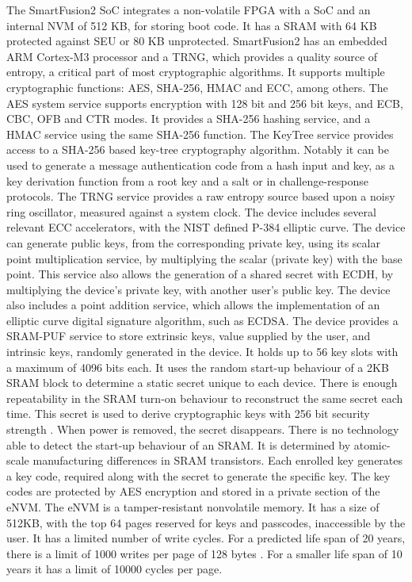 The SmartFusion2 \ac{SoC} integrates a non-volatile \ac{FPGA} with a \ac{SoC} and an internal \ac{NVM} of 512 KB, for storing boot code.
It has a \ac{SRAM} with 64 KB protected against \ac{SEU} or 80 KB unprotected. SmartFusion2 has an embedded ARM Cortex-M3 processor and a \ac{TRNG}, which provides a quality source of entropy, a critical part of most cryptographic algorithms. It supports multiple cryptographic functions: \ac{AES}, \ac{SHA}-256, \ac{HMAC} and \ac{ECC}, among others.
The \ac{AES} system service supports encryption with 128 bit and 256 bit keys, and ECB, CBC, OFB and CTR modes.
It provides a \ac{SHA}-256 hashing service, and a \ac{HMAC} service using the same \ac{SHA}-256 function.
The KeyTree service provides access to a SHA-256 based key-tree cryptography algorithm. Notably it can be used to generate a message authentication code from a hash input and key, as a key derivation function from a root key and a salt or in challenge-response protocols.
The \ac{TRNG} service provides a raw entropy source based upon a noisy ring oscillator, measured against a system clock.
The device includes several relevant \ac{ECC} accelerators, with the \ac{NIST} defined P-384 elliptic curve.
The device can generate public keys, from the corresponding private key, using its scalar point multiplication service, by multiplying the scalar (private key) with the base point. This service also allows the generation of a shared secret with \ac{ECDH}, by multiplying the device's private key, with another user's public key.
The device also includes a point addition service, which allows the implementation of an elliptic curve digital signature algorithm, such as ECDSA.
The device provides a SRAM-PUF service to store extrinsic keys, value supplied by the user, and intrinsic keys, randomly generated in the device.
It holds up to 56 key slots with a maximum of 4096 bits each.
It uses the random start-up behaviour of a 2KB \ac{SRAM} block to determine a static secret unique to each device. There is enough repeatability in the SRAM turn-on behaviour to reconstruct the same secret each time. This secret is used to derive cryptographic keys with 256 bit security strength \cite{smartfusionSecurityPractices}.
When power is removed, the secret disappears. There is no technology able to detect the start-up behaviour of an SRAM. It is determined by atomic-scale manufacturing differences in SRAM transistors.
Each enrolled key generates a key code, required along with the secret to generate the specific key.
The key codes are protected by \ac{AES} encryption and stored in a private section of the eNVM.
The eNVM is a tamper-resistant nonvolatile memory. It has a size of 512KB, with the top 64 pages reserved for keys and passcodes, inaccessible by the user.
It has a limited number of write cycles. For a predicted life span of 20 years, there is a limit of 1000 writes per page of 128 bytes \cite{smartfusionDatasheet}. For a smaller life span of 10 years it has a limit of 10000 cycles per page.

